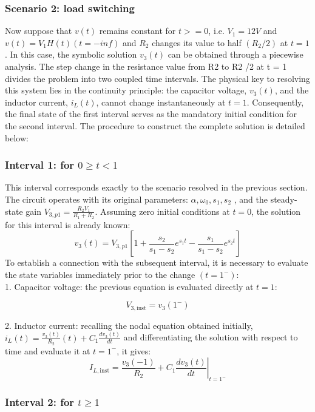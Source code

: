 \documentclass[11pt, a4paper]{article}
\begin{document}
\subsubsection*{Scenario 2: load switching}
Now suppose that $v(t)$ remains constant for $t>=0$, i.e. $V_1 = 12 V$ and $v(t) = V_1 H(t) (t = - inf)$ and
$R_2$ changes its value to half $(R_2 /2)$ at $t = 1$.
In this case, the symbolic solution $v_3 (t)$ can be obtained through a piecewise analysis.
The step change in the resistance value from R2 to R2 /2 at t = 1 divides the problem into two coupled time intervals. The physical key to resolving this system lies in the continuity principle: the capacitor voltage, $v_3 (t)$, and the inductor current, $i_L (t)$, cannot change instantaneously at $t = 1$. Consequently, the final state of the first interval serves
as the mandatory initial condition for the second interval. The procedure to construct the complete solution is detailed below:

\subsubsection*{Interval 1: for $0 \ge t < 1$}

This interval corresponds exactly to the scenario resolved in the previous section. The circuit operates with its original parameters: $\alpha, \omega_0 , s_1 , s_2$ , and the steady-state gain $V_{3,p1} = \frac{R_2 V_1}{R_1+R_2}$. Assuming zero initial conditions at $t = 0$, the solution for this interval is already known:
\[
v_3 (t) =V_{3,p1}
\left[1+\frac{s_2}{s_1-s_2}e^{s_1t}  -\frac{ s_1}{s_1-s_2}e^{s_2t} \right]
\]
To establish a connection with the subsequent interval, it is necessary to evaluate the state variables immediately prior to the change $(t =1^-)$:\\

1. Capacitor voltage: the previous equation is evaluated directly at $t = 1$:

\[
V_{3,\mathrm{inst}} = v_3 (1^-)
\]

2. Inductor current: recalling the nodal equation obtained initially,
$i_{L} (t) = \frac{v_3(t)}{R_2} (t) + C_1 \frac{dv_3(t)}{dt}$ and differentiating the solution with respect to time and evaluate it at $t = 1^-$, it gives:
\[
I_{L,\mathrm{inst}} =\frac{v_3(-1)}{R_2}+ C_1
   \left.\frac{dv_3(t)}{dt}\right|_{t=1^-}
\]



\subsubsection*{Interval 2: for $t \ge 1$}
\end{document}
